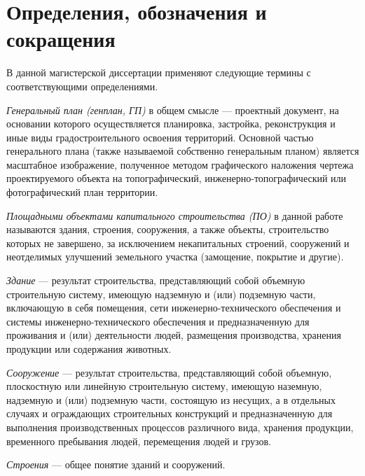 \section*{\Large{Определения, обозначения и сокращения}}

В данной магистерской диссертации применяют следующие термины с соответствующими определениями.

\textit{Генеральный план (генплан, ГП)} в общем смысле —
проектный документ, на основании которого осуществляется планировка,
застройка, реконструкция и иные виды градостроительного освоения территорий.
Основной частью генерального плана (также называемой собственно генеральным планом)
является масштабное изображение, полученное методом графического наложения чертежа
проектируемого объекта на топографический,
инженерно-топографический или фотографический план территории.


\textit{Площадными объектами капитального строительства (ПО)} в данной работе называются
здания, строения, сооружения, а также объекты, строительство которых не завершено, за исключением некапитальных строений,
сооружений и неотделимых улучшений земельного участка (замощение, покрытие и другие)\cite{CapitalBuilding}.


\textit{Здание} — результат строительства, представляющий собой объемную строительную систему,
имеющую надземную и (или) подземную части, включающую в себя помещения,
сети инженерно-технического обеспечения и системы инженерно-технического обеспечения и предназначенную для проживания и
(или) деятельности людей, размещения производства, хранения продукции или содержания животных\cite{SafetyBuildings}.


\textit{Сооружение} — результат строительства,
представляющий собой объемную, плоскостную или линейную строительную систему,
имеющую наземную, надземную и (или) подземную части, состоящую из несущих,
а в отдельных случаях и ограждающих строительных конструкций и предназначенную для выполнения
производственных процессов различного вида, хранения продукции, временного пребывания людей,
перемещения людей и грузов\cite{SafetyBuildings}.


\textit{Строения} — общее понятие зданий и сооружений\cite{CivilCode}.